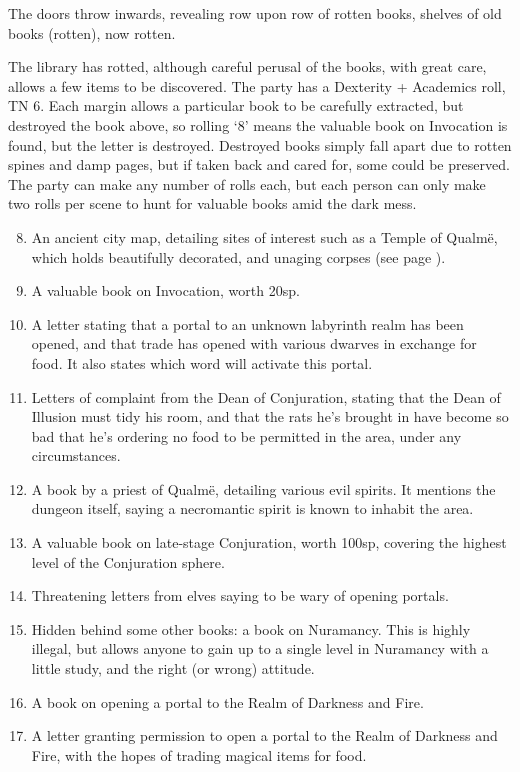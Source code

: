 \begin{multicols}{2}
\begin{boxtext}
	The doors throw inwards, revealing row upon row of rotten books, shelves of old books (rotten), now rotten.
\end{boxtext}

The library has rotted, although careful perusal of the books, with great care, allows a few items to be discovered.
The party has a Dexterity + Academics roll, TN 6.
Each margin allows a particular book to be carefully extracted, but destroyed the book above, so rolling `8' means the valuable book on Invocation is found, but the letter is destroyed.
Destroyed books simply fall apart due to rotten spines and damp pages, but if taken back and cared for, some could be preserved.
The party can make any number of rolls each, but each person can only make two rolls per scene to hunt for valuable books amid the dark mess.

\begin{enumerate}

\setcounter{enumi}{7}
	\item{An ancient city map, detailing sites of interest such as a Temple of Qualm\"{e}, which holds beautifully decorated, and unaging corpses (see page \pageref{green_tower})}.
	\item{A valuable book on Invocation, worth 20sp.}
	\item{A letter stating that a portal to an unknown labyrinth realm has been opened, and that trade has opened with various dwarves in exchange for food.  It also states which word will activate this portal.}
	\item{Letters of complaint from the Dean of Conjuration, stating that the Dean of Illusion must tidy his room, and that the rats he's brought in have become so bad that he's ordering no food to be permitted in the area, under any circumstances.}
	\item{A book by a priest of Qualm\"{e}, detailing various evil spirits.  It mentions the dungeon itself, saying a necromantic spirit is known to inhabit the area.}
	\item{A valuable book on late-stage Conjuration, worth 100sp, covering the highest level of the Conjuration sphere.}
	\item{Threatening letters from elves saying to be wary of opening portals.}
	\item{Hidden behind some other books: a book on Nuramancy.  This is highly illegal, but allows anyone to gain up to a single level in Nuramancy with a little study, and the right (or wrong) attitude.}
	\item{A book on opening a portal to the Realm of Darkness and Fire.}
	\item{A letter granting permission to open a portal to the Realm of Darkness and Fire, with the hopes of trading magical items for food.}


\end{enumerate}
\end{multicols}
